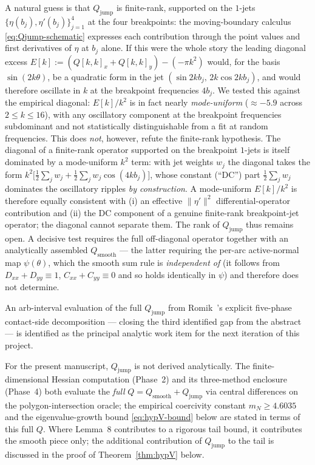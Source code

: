 \documentclass[11pt]{amsart}
\theoremstyle{plain}
\theoremstyle{definition}
\begin{document}
A natural guess is that $Q_{\mathrm{jump}}$ is finite-rank, supported
on the $1$-jets $\{\eta(b_{j}), \eta'(b_{j})\}_{j=1}^{4}$ at the four
breakpoints: the moving-boundary calculus
\eqref{eq:Qjump-schematic} expresses each contribution through the
point values and first derivatives of $\eta$ at $b_{j}$ alone.  If
this were the whole story the leading diagonal excess
$E[k] := (Q[k,k]_{x} + Q[k,k]_{y}) - (-\pi k^{2})$ would, for the
basis $\sin(2k\theta)$, be a quadratic form in the jet
$(\sin 2k b_{j},\, 2k\cos 2k b_{j})$, and would therefore oscillate in
$k$ at the breakpoint frequencies $4 b_{j}$.  We tested this against
the empirical diagonal: $E[k]/k^{2}$ is in fact nearly
\emph{mode-uniform} ($\approx -5.9$ across $2 \leq k \leq 16$), with
any oscillatory component at the breakpoint frequencies subdominant
and not statistically distinguishable from a fit at random
frequencies.  This does \emph{not}, however, refute the finite-rank
hypothesis.  The diagonal of a finite-rank operator supported on the
breakpoint $1$-jets is itself dominated by a mode-uniform $k^{2}$
term: with jet weights $w_{j}$ the diagonal takes the form
$k^{2}\bigl[\tfrac12\sum_{j} w_{j} + \tfrac12\sum_{j} w_{j}\cos(4 k
b_{j})\bigr]$, whose constant (``DC'') part $\tfrac12\sum_{j} w_{j}$
dominates the oscillatory ripples \emph{by construction}.  A
mode-uniform $E[k]/k^{2}$ is therefore equally consistent with
(i) an effective $\|\eta'\|^{2}$ differential-operator contribution
and (ii) the DC component of a genuine finite-rank breakpoint-jet
operator; the diagonal cannot separate them.  The rank of
$Q_{\mathrm{jump}}$ thus remains open.  A decisive test requires the
full off-diagonal operator together with an analytically assembled
$Q_{\mathrm{smooth}}$ --- the latter requiring the per-arc
active-normal map $\psi(\theta)$, which the smooth sum rule is
\emph{independent of} (it follows from $D_{xx}+D_{yy}\equiv1$,
$C_{xx}+C_{yy}\equiv0$ and so holds identically in $\psi$) and
therefore does not determine.

An arb-interval evaluation of the full $Q_{\mathrm{jump}}$ from
Romik~\cite[\S4]{Romik2018}'s explicit five-phase contact-side
decomposition --- closing the third identified gap from the
abstract --- is identified as the principal analytic work item
for the next iteration of this project.

For the present manuscript, $Q_{\mathrm{jump}}$ is not derived
analytically.  The finite-dimensional Hessian computation
(Phase~2) and its three-method enclosure (Phase~4) both evaluate
the \emph{full} $Q = Q_{\mathrm{smooth}} + Q_{\mathrm{jump}}$ via
central differences on the polygon-intersection oracle; the
empirical coercivity constant $m_{N} \geq 4.6035$ and the
eigenvalue-growth bound \eqref{eq:hypV-bound} below are stated
in terms of this full $Q$.  Where Lemma~8 contributes to a
rigorous tail bound, it contributes the smooth piece only;
the additional contribution of $Q_{\mathrm{jump}}$ to the tail is
discussed in the proof of Theorem~\ref{thm:hypV} below.
\end{document}
